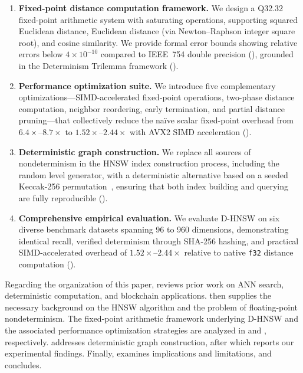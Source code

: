 \documentclass[10pt,journal]{IEEEtran}
\newcommand{\dhnsw}{\textsc{D-HNSW}}
\newcommand{\hnsw}{\textsc{HNSW}}
\begin{document}
\begin{enumerate}[leftmargin=*]
  \item \textbf{Fixed-point distance computation framework.} We design a Q32.32 fixed-point arithmetic system with saturating operations, supporting squared Euclidean distance, Euclidean distance (via Newton--Raphson integer square root), and cosine similarity. We provide formal error bounds showing relative errors below $4 \times 10^{-10}$ compared to IEEE~754 double precision (), grounded in the Determinism Trilemma framework ().

  \item \textbf{Performance optimization suite.} We introduce five complementary optimizations---SIMD-accelerated fixed-point operations, two-phase distance computation, neighbor reordering, early termination, and partial distance pruning---that collectively reduce the na\"ive scalar fixed-point overhead from $6.4\times$--$8.7\times$ to $1.52\times$--$2.44\times$ with AVX2 SIMD acceleration ().

  \item \textbf{Deterministic graph construction.} We replace all sources of nondeterminism in the \hnsw{} index construction process, including the random level generator, with a deterministic alternative based on a seeded Keccak-256 permutation~\cite{bertoni2013keccak}, ensuring that both index building and querying are fully reproducible ().

  \item \textbf{Comprehensive empirical evaluation.} We evaluate \dhnsw{} on six diverse benchmark datasets spanning 96 to 960 dimensions, demonstrating identical recall, verified determinism through SHA-256 hashing, and practical SIMD-accelerated overhead of $1.52\times$--$2.44\times$ relative to native \texttt{f32} distance computation ().
\end{enumerate}

Regarding the organization of this paper,  reviews prior work on ANN search, deterministic computation, and blockchain applications.  then supplies the necessary background on the \hnsw{} algorithm and the problem of floating-point nondeterminism. The fixed-point arithmetic framework underlying \dhnsw{} and the associated performance optimization strategies are analyzed in  and , respectively.  addresses deterministic graph construction, after which  reports our experimental findings. Finally,  examines implications and limitations, and  concludes.
\end{document}
